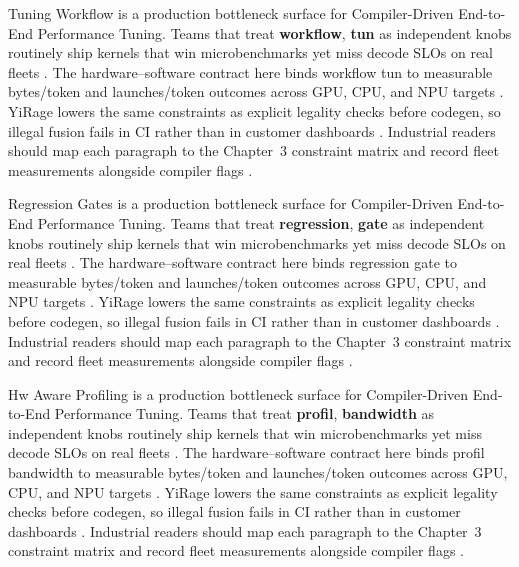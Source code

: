 Tuning Workflow is a production bottleneck surface for Compiler-Driven End-to-End Performance Tuning. Teams that treat \textbf{workflow}, \textbf{tun} as independent knobs routinely ship kernels that win microbenchmarks yet miss decode SLOs on real fleets \citep{memoryfloor2026,amd2024xdna}. The hardware--software contract here binds workflow tun to measurable bytes/token and launches/token outcomes across GPU, CPU, and NPU targets \citep{nvidia2022hopper,amd2024aie}. YiRage lowers the same constraints as explicit legality checks before codegen, so illegal fusion fails in CI rather than in customer dashboards \citep{semianalysis2024tma,dlbook}. Industrial readers should map each paragraph to the Chapter~3 constraint matrix and record fleet measurements alongside compiler flags \citep{amd2024xdna,dao2022flashattention}.

Regression Gates is a production bottleneck surface for Compiler-Driven End-to-End Performance Tuning. Teams that treat \textbf{regression}, \textbf{gate} as independent knobs routinely ship kernels that win microbenchmarks yet miss decode SLOs on real fleets \citep{nvidia2022hopper,amd2024aie}. The hardware--software contract here binds regression gate to measurable bytes/token and launches/token outcomes across GPU, CPU, and NPU targets \citep{semianalysis2024tma,dlbook}. YiRage lowers the same constraints as explicit legality checks before codegen, so illegal fusion fails in CI rather than in customer dashboards \citep{amd2024xdna,dao2022flashattention}. Industrial readers should map each paragraph to the Chapter~3 constraint matrix and record fleet measurements alongside compiler flags \citep{amd2024aie,kwon2023vllm}.

Hw Aware Profiling is a production bottleneck surface for Compiler-Driven End-to-End Performance Tuning. Teams that treat \textbf{profil}, \textbf{bandwidth} as independent knobs routinely ship kernels that win microbenchmarks yet miss decode SLOs on real fleets \citep{semianalysis2024tma,dlbook}. The hardware--software contract here binds profil bandwidth to measurable bytes/token and launches/token outcomes across GPU, CPU, and NPU targets \citep{amd2024xdna,dao2022flashattention}. YiRage lowers the same constraints as explicit legality checks before codegen, so illegal fusion fails in CI rather than in customer dashboards \citep{amd2024aie,kwon2023vllm}. Industrial readers should map each paragraph to the Chapter~3 constraint matrix and record fleet measurements alongside compiler flags \citep{dlbook,nvidia2024cudagraphs}.

